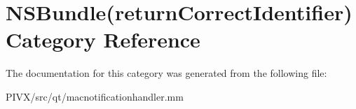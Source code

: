 \hypertarget{category_n_s_bundle_07return_correct_identifier_08}{}\section{N\+S\+Bundle(return\+Correct\+Identifier) Category Reference}
\label{category_n_s_bundle_07return_correct_identifier_08}


The documentation for this category was generated from the following file\+:\begin{DoxyCompactItemize}
\item 
P\+I\+V\+X/src/qt/macnotificationhandler.\+mm\end{DoxyCompactItemize}
